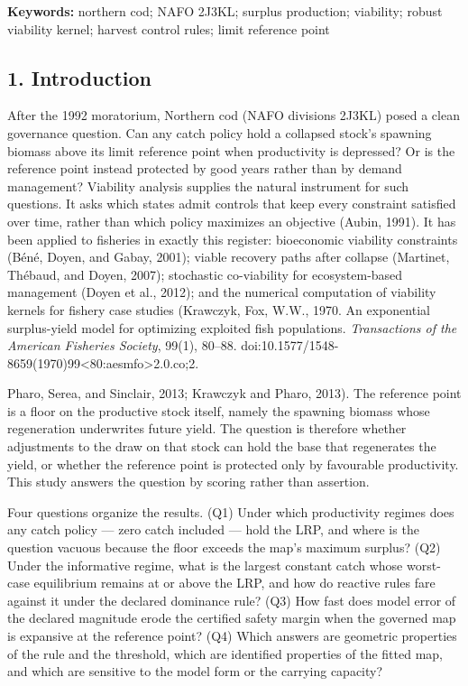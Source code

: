 \textbf{Keywords:} northern cod; NAFO 2J3KL; surplus production;
viability; robust viability kernel; harvest control rules; limit
reference point

\subsection{1. Introduction}\label{budget-introduction}

After the 1992 moratorium, Northern cod (NAFO divisions 2J3KL) posed a
clean governance question. Can any catch policy hold a collapsed stock's
spawning biomass above its limit reference point when productivity is
depressed? Or is the reference point instead protected by good years
rather than by demand management? Viability analysis supplies the
natural instrument for such questions. It asks which states admit
controls that keep every constraint satisfied over time, rather than
which policy maximizes an objective (Aubin, 1991). It has been applied
to fisheries in exactly this register: bioeconomic viability constraints
(B\'en\'e, Doyen, and Gabay, 2001); viable recovery paths after collapse
(Martinet, Th\'ebaud, and Doyen, 2007); stochastic co-viability for
ecosystem-based management (Doyen et al., 2012); and the numerical
computation of viability kernels for fishery case studies (Krawczyk,
Fox, W.W., 1970. An exponential surplus-yield model for optimizing exploited fish
populations. \emph{Transactions of the American Fisheries Society}, 99(1), 80--88.
doi:10.1577/1548-8659(1970)99<80:aesmfo>2.0.co;2.

Pharo, Serea, and Sinclair, 2013; Krawczyk and Pharo, 2013). The
reference point is a floor on the productive stock itself, namely the
spawning biomass whose regeneration underwrites future yield. The
question is therefore whether adjustments to the draw on that stock can
hold the base that regenerates the yield, or whether the reference point
is protected only by favourable productivity. This study answers the
question by scoring rather than assertion.

Four questions organize the results. (Q1) Under which productivity
regimes does any catch policy --- zero catch included --- hold the LRP,
and where is the question vacuous because the floor exceeds the map's
maximum surplus? (Q2) Under the informative regime, what is the largest
constant catch whose worst-case equilibrium remains at or above the LRP,
and how do reactive rules fare against it under the declared dominance
rule? (Q3) How fast does model error of the declared magnitude erode the
certified safety margin when the governed map is expansive at the
reference point? (Q4) Which answers are geometric properties of the rule
and the threshold, which are identified properties of the fitted map,
and which are sensitive to the model form or the carrying capacity?


